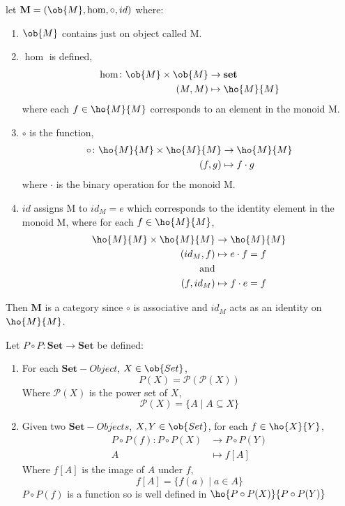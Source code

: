 \begin{example}
let $\mathbf{M} = (\ob{M},\hom,\circ,id)$ where:
\begin{enumerate}
    \item $\ob{M}$ contains just on object called M.
    \item $\hom$ is defined,
    \begin{align*}
        \hom\colon \ob{M}\times\ob{M}&\rightarrow \mathbf{set}\\
        (M,M)&\mapsto\ho{M}{M}
    \end{align*}
    where each $f\in\ho{M}{M}$ corresponds to an element in the monoid M.
    \item $\circ$ is the function,
    \begin{align*}
        \circ\colon \ho{M}{M}\times\ho{M}{M}&\rightarrow\ho{M}{M}\\
        (f,g)&\mapsto f\cdot g
    \end{align*}
    where $\cdot$ is the binary operation for the monoid M.
    \item $id$ assigns M to $id_{M} = e$ which corresponds to the identity element in the monoid M, where for each $f\in\ho{M}{M}$,
    \begin{align*}
        \ho{M}{M}\times\ho{M}{M}&\rightarrow\ho{M}{M}\\
        (id_{M},f)&\mapsto e\cdot f = f\\
        \text{and}\\
        (f,id_{M})&\mapsto f\cdot e = f
    \end{align*}
\end{enumerate}
Then $\mathbf{M}$ is a category since $\circ$ is associative and $id_{M}$ acts as an identity on $\ho{M}{M}$.
\end{example}

\begin{example}
Let $P\circ P\colon\mathbf{Set}\rightarrow\mathbf{Set}$ be defined:
\begin{enumerate}
    \item For each $\mathbf{Set}-Object$, $X\in\ob{Set}$,
    \[P(X)=\mathcal{P}(\mathcal{P}(X))\]
    Where $\mathcal{P}(X)$ is the power set of $X$,
    \[\mathcal{P}(X)=\{A\mid A\subseteq X\}\]
    \item Given two $\mathbf{Set}-Objects$, $X,Y\in\ob{Set}$, for each $f\in\ho{X}{Y}$,
    \begin{align*}
        P\circ P(f):P\circ P(X)&\rightarrow P\circ P(Y)\\
        A&\mapsto f[A]
    \end{align*}
    Where $f[A]$ is the image of $A$ under $f$,
    \[f[A]=\{f(a)\mid a\in A\}\]
    $P\circ P(f)$ is a function so is well defined in $\ho{P\circ P(X)}{P\circ P(Y)}$
\end{enumerate}
\end{example}

